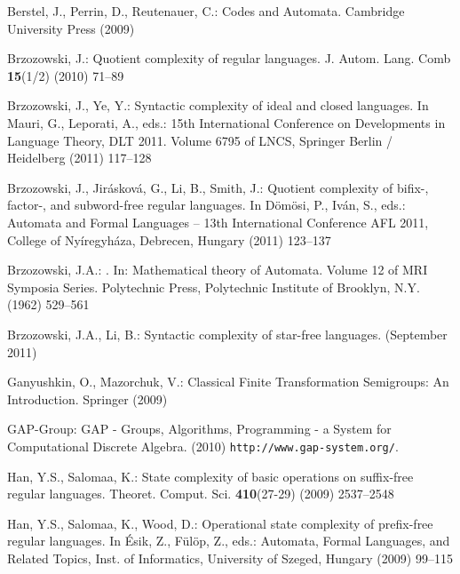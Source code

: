 \documentclass{llncs}
\begin{document}
\begin{thebibliography}{10}

Berstel, J., Perrin, D., Reutenauer, C.:
\newblock Codes and Automata.
\newblock Cambridge University Press (2009)

Brzozowski, J.:
\newblock Quotient complexity of regular languages.
\newblock J. Autom. Lang. Comb \textbf{15}(1/2) (2010)  71--89

Brzozowski, J., Ye, Y.:
\newblock Syntactic complexity of ideal and closed languages.
\newblock In Mauri, G., Leporati, A., eds.: 15th International Conference on
  Developments in Language Theory, DLT 2011. Volume 6795 of LNCS, Springer
  Berlin / Heidelberg (2011)  117--128

Brzozowski, J., Jir{\'a}skov{\'a}, G., Li, B., Smith, J.:
\newblock Quotient complexity of bifix-, factor-, and subword-free regular
  languages.
\newblock In D\"{o}m\"{o}si, P., Iv\'{a}n, S., eds.: Automata and Formal
  Languages – 13th International Conference AFL 2011, College of
  Ny\'{i}regyh\'{a}za, Debrecen, Hungary (2011)  123--137

Brzozowski, J.A.:
.
\newblock In: Mathematical theory of Automata. Volume 12 of MRI Symposia
  Series.
\newblock Polytechnic Press, Polytechnic Institute of Brooklyn, N.Y. (1962)
  529--561

Brzozowski, J.A., Li, B.:
\newblock Syntactic complexity of star-free languages.
 (September 2011)

Ganyushkin, O., Mazorchuk, V.:
\newblock Classical Finite Transformation Semigroups: An Introduction.
\newblock Springer (2009)

GAP-Group:
\newblock GAP - Groups, Algorithms, Programming - a System for Computational
  Discrete Algebra.
\newblock (2010) {\tt http://www.gap-system.org/}.

Han, Y.S., Salomaa, K.:
\newblock State complexity of basic operations on suffix-free regular
  languages.
\newblock Theoret. Comput. Sci. \textbf{410}(27-29) (2009)  2537--2548

Han, Y.S., Salomaa, K., Wood, D.:
\newblock Operational state complexity of prefix-free regular languages.
\newblock In {\'E}sik, Z., F{\"u}l{\"o}p, Z., eds.: Automata, Formal Languages,
  and Related Topics, Inst. of Informatics, University of Szeged, Hungary
  (2009)  99--115


\end{thebibliography}
\end{document}
